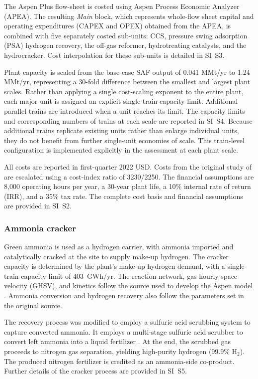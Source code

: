 The Aspen Plus flow-sheet is costed using Aspen Process Economic Analyzer (APEA). The resulting \textit{Main} block, which represents whole-flow sheet capital and operating expenditures (CAPEX and OPEX) obtained from the APEA, is combined with five separately costed sub-units: CCS, pressure swing adsorption (PSA) hydrogen recovery, the off-gas reformer, hydrotreating catalysts, and the hydrocracker. Cost interpolation for these sub-units is detailed in SI~S3.

Plant capacity is scaled from the base-case SAF output of 0.041 MMt/yr to 1.24 MMt/yr, representing a 30-fold difference between the smallest and largest plant scales. Rather than applying a single cost-scaling exponent to the entire plant, each major unit is assigned an explicit single-train capacity limit. Additional parallel trains are introduced when a unit reaches its limit. The capacity limits and corresponding numbers of trains at each scale are reported in SI~S4. Because additional trains replicate existing units rather than enlarge individual units, they do not benefit from further single-unit economies of scale. This train-level configuration is implemented explicitly in the assessment at each plant scale.

All costs are reported in first-quarter 2022 USD. Costs from the original study of \citep{jones2013process} are escalated using a cost-index ratio of 3230/2250. The financial assumptions are 8,000 operating hours per year, a 30-year plant life, a 10\% internal rate of return (IRR), and a 35\% tax rate. The complete cost basis and financial assumptions are provided in SI~S2.

\subsubsection{Ammonia cracker}\label{sec:methods-cracker}

Green ammonia is used as a hydrogen carrier, with ammonia imported and catalytically cracked at the site to supply make-up hydrogen. The cracker capacity is determined by the plant's make-up hydrogen demand, with a single-train capacity limit of 403~GWh/yr. The reaction network, gas hourly space velocity (GHSV), and kinetics follow the source used to develop the Aspen model \citep{cho2024ammonia}. Ammonia conversion and hydrogen recovery also follow the parameters set in the original source. 

The recovery process was modified to employ a sulfuric acid scrubbing system to capture converted ammonia. It employs a multi-stage sulfuric acid scrubber to convert left ammonia into a liquid fertilizer \citep{manuzon2007prototype}. At the end, the scrubbed gas proceeds to nitrogen gas separation, yielding high-purity hydrogen (99.9\% H$_2$). The produced nitrogen fertilizer is credited as an ammonia-side co-product. Further details of the cracker process are provided in SI~S5.

